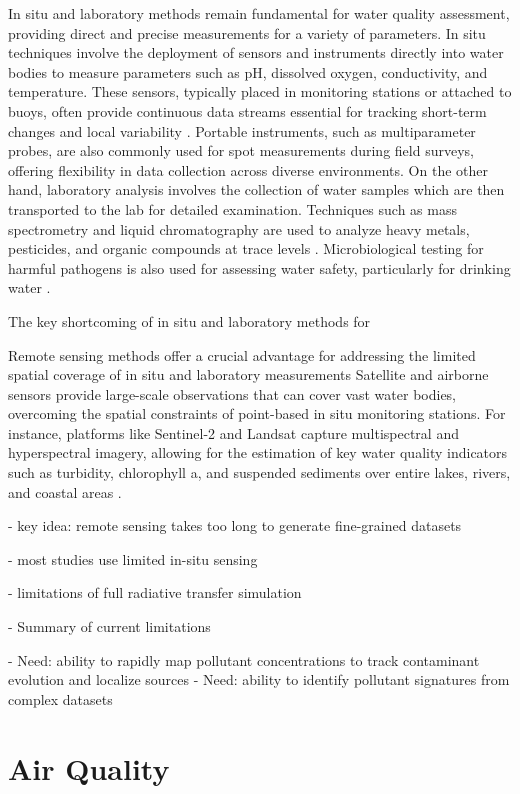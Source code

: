 In situ and laboratory methods remain fundamental for water quality assessment,
providing direct and precise measurements for a variety of parameters. In situ
techniques involve the deployment of sensors and
instruments directly into water bodies to measure parameters such as pH,
dissolved oxygen, conductivity, and temperature. These sensors,
typically placed in monitoring stations or attached to buoys, often provide continuous
data streams essential for tracking short-term changes and local variability
\cite{in-situ-water-quality}. Portable instruments, such as multiparameter probes, are
also commonly used for spot measurements during field surveys, offering
flexibility in data collection across diverse environments. On the other hand,
laboratory analysis involves the collection of water samples which are then
transported to the lab for detailed examination.
Techniques such as mass spectrometry and liquid chromatography are used to
analyze heavy metals, pesticides, and organic compounds at
trace levels \cite{mass-spec-water, lc-ms}. Microbiological testing for harmful
pathogens is also used for assessing water safety, particularly for drinking
water \cite{microbio-methods}.

The key shortcoming of in situ and laboratory methods for 

Remote sensing methods offer a crucial advantage for addressing the limited
spatial coverage of in situ and laboratory measurements
Satellite and airborne sensors provide large-scale
observations that can cover vast water bodies, overcoming the spatial
constraints of point-based in situ monitoring stations. For instance, platforms
like Sentinel-2 and Landsat capture multispectral and hyperspectral imagery,
allowing for the estimation of key water quality indicators such as turbidity,
chlorophyll a, and suspended sediments over entire lakes, rivers, and coastal
areas \cite{}.


- key idea: remote sensing takes too long to generate fine-grained datasets

- most studies use limited in-situ sensing

- limitations of full radiative transfer simulation

- Summary of current limitations

- Need: ability to rapidly map pollutant concentrations to track contaminant
evolution and localize sources
- Need: ability to identify pollutant signatures from complex datasets


\section{Air Quality}

